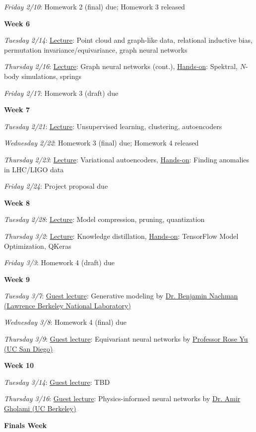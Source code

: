 \documentclass[12pt]{article}
\begin{document}
\emph{Friday 2/10}: Homework 2 (final) due; Homework 3 released

\noindent\textbf{Week 6}

\emph{Tuesday 2/14}: \underline{Lecture}: Point cloud and graph-like data, relational inductive bias, permutation invariance/equivariance, graph neural networks

\emph{Thursday 2/16}: \underline{Lecture}: Graph neural networks (cont.), \underline{Hands-on}: Spektral, $N$-body simulations, springs

\emph{Friday 2/17}: Homework 3 (draft) due

\noindent\textbf{Week 7}

\emph{Tuesday 2/21}: \underline{Lecture}: Unsupervised learning, clustering, autoencoders

\emph{Wednesday 2/22}: Homework 3 (final) due; Homework 4 released

\emph{Thursday 2/23}: \underline{Lecture}: Variational autoencoders, \underline{Hands-on}: Finding anomalies in LHC/LIGO data

\emph{Friday 2/24}: Project proposal due

\noindent\textbf{Week 8}

\emph{Tuesday 2/28}: \underline{Lecture}: Model compression, pruning, quantization

\emph{Thursday 3/2}: \underline{Lecture}: Knowledge distillation, \underline{Hands-on}: TensorFlow Model Optimization, QKeras

\emph{Friday 3/3}: Homework 4 (draft) due

\noindent\textbf{Week 9}

\emph{Tuesday 3/7}: \underline{Guest lecture}: Generative modeling by \href{https://bids.berkeley.edu/people/benjamin-nachman}{Dr. Benjamin Nachman (Lawrence Berkeley National Laboratory)}

\emph{Wednesday 3/8}: Homework 4 (final) due

\emph{Thursday 3/9}: \underline{Guest lecture}: Equivariant neural networks by \href{https://roseyu.com/}{Professor Rose Yu (UC San Diego)}

\noindent\textbf{Week 10}

\emph{Tuesday 3/14}: \underline{Guest lecture}: TBD

\emph{Thursday 3/16}: \underline{Guest lecture}: Physics-informed neural networks by \href{https://amirgholami.org/}{Dr. Amir Gholami (UC Berkeley)}

\noindent\textbf{Finals Week}
\end{document}
